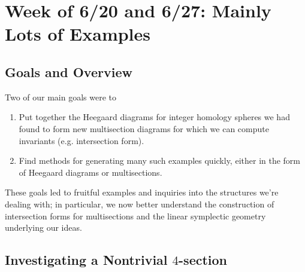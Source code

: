 \section{Week of 6/20 and 6/27: Mainly Lots of Examples}

\subsection*{Goals and Overview}
Two of our main goals were to
\begin{enumerate}
	\item Put together the Heegaard diagrams for integer homology spheres we had found to form new multisection diagrams for which we can compute invariants (e.g. intersection form).
	\item Find methods for generating many such examples quickly, either in the form of Heegaard diagrams or multisections.
\end{enumerate}

These goals led to fruitful examples and inquiries into the structures we're dealing with; in particular, we now better understand the construction of intersection forms for multisections and the linear symplectic geometry underlying our ideas.

\subsection{Investigating a Nontrivial $4$-section}

